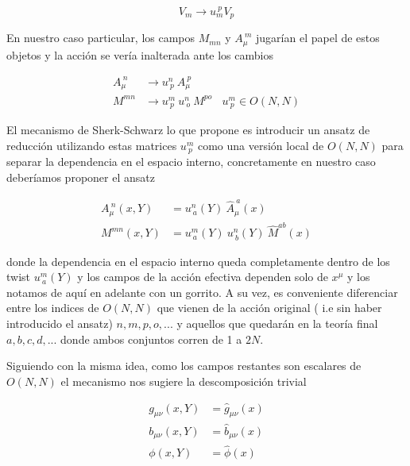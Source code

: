 \documentclass{article}
\numberwithin{equation}{section}
\begin{document}
\begin{equation}
V_{m} \longrightarrow u_{m}^{\ p}  V_{p}
\end{equation}

En nuestro caso particular, los campos $ M_{m n} $ y $ A_{\mu}^{\ m} $ jugarían el papel de estos objetos y la acción se vería inalterada ante los cambios

\begin{equation}
\begin{aligned}
A_{\mu}^{\ n}& \longrightarrow u^{n}_{\ p} \ A_{\mu}^{\ p}\\
M^{m n}& \longrightarrow u^{m}_{\ p} \ u^{n}_{\ o} \ M^{p o} \ \ \ \ u^{m}_{\ p} \in O(N,N)
\end{aligned}
\end{equation}


El mecanismo de Sherk-Schwarz lo que propone es introducir un ansatz de reducción utilizando estas matrices $ u^{m}_{\ p} $ como una versión local de $ O(N,N) $ para separar la dependencia en el espacio interno, concretamente en nuestro caso deberíamos proponer el ansatz


\begin{subequations}
\begin{align}
A_{\mu}^{\ n}(x,Y)&= u^{n}_{\ a}(Y) \ \hat{A}_{\mu}^{\ a}(x)\\
M^{m n}(x,Y)&= u^{m}_{\ a}(Y) \ u^{n}_{\ b}(Y) \ \hat{M}^{a b}(x)
\end{align}
\end{subequations}


donde la dependencia en el espacio interno queda completamente dentro de los twist $ u^{m}_{\ a}(Y) $ y los campos de la acción efectiva dependen solo de $ x^{\mu} $ y los notamos de aquí en adelante con un gorrito. A su vez, es conveniente diferenciar entre los indices de $ O(N,N) $ que vienen de la acción original ( i.e sin haber introducido el ansatz) $ n,m,p,o,...  $ y aquellos que quedarán en la teoría final $ a,b,c,d,... $ donde ambos conjuntos corren de 1 a $ 2N $.

Siguiendo con la misma idea, como los campos restantes son escalares de $ O(N,N) $ el mecanismo nos sugiere la descomposición trivial

\begin{equation}
\begin{aligned}
g_{\mu \nu}(x,Y)&= \hat{g}_{\mu \nu}(x)\\
b_{\mu \nu}(x,Y)&= \hat{b}_{\mu \nu}(x)\\
\phi(x,Y)&= \hat{\phi}(x)\\
\end{aligned}
\end{equation}
\end{document}
